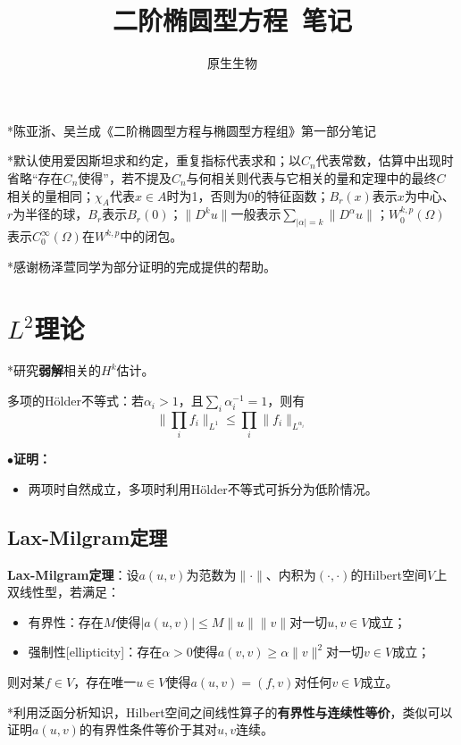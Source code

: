 \documentclass[a4paper,UTF8,fontset=windows,AutoFakeBold]{ctexart}
\title{\textbf{二阶椭圆型方程\ 笔记}}
\author{原生生物}
\date{}
\newcommand{\proo}[1]{{\kaishu $\bullet$\textbf{证明：}
\begin{itemize}
    \item[] #1
\end{itemize}
}}
\begin{document}
\maketitle

*陈亚浙、吴兰成《二阶椭圆型方程与椭圆型方程组》第一部分笔记

*默认使用爱因斯坦求和约定，重复指标代表求和；以$C_n$代表常数，估算中出现时省略``存在$C_n$使得''，若不提及$C_n$与何相关则代表与它相关的量和定理中的最终$C$相关的量相同；$\chi_A$代表$x\in A$时为1，否则为0的特征函数；$B_r(x)$表示$x$为中心、$r$为半径的球，$B_r$表示$B_r(0)$；$\|D^ku\|$一般表示$\sum_{|\alpha|=k}\|D^\alpha u\|$；$W_0^{k,p}(\Omega)$表示$C_0^\infty(\Omega)$在$W^{k,p}$中的闭包。

*感谢杨泽萱同学为部分证明的完成提供的帮助。

\tableofcontents

\newpage
\section{$L^2$理论}
*研究\textbf{弱解}相关的$H^k$估计。

多项的H\"older不等式：若$\alpha_i>1$，且$\sum_i\alpha_i^{-1}=1$，则有
$$\bigg\|\prod_if_i\bigg\|_{L^1}\le\prod_i\|f_i\|_{L^{\alpha_i}}$$
\proo{
    两项时自然成立，多项时利用H\"older不等式可拆分为低阶情况。
}

\subsection{Lax-Milgram定理}
\textbf{Lax-Milgram定理}：设$a(u,v)$为范数为$\|\cdot\|$、内积为$(\cdot,\cdot)$的Hilbert空间$V$上双线性型，若满足：
\begin{itemize}
    \item 有界性：存在$M$使得$|a(u,v)|\le M\|u\|\|v\|$对一切$u,v\in V$成立；
    \item 强制性[ellipticity]：存在$\alpha>0$使得$a(v,v)\ge\alpha\|v\|^2$对一切$v\in V$成立；
\end{itemize}
则对某$f\in V$，存在唯一$u\in V$使得$a(u,v)=(f,v)$对任何$v\in V$成立。

*利用泛函分析知识，Hilbert空间之间线性算子的\textbf{有界性与连续性等价}，类似可以证明$a(u,v)$的有界性条件等价于其对$u,v$连续。
\end{document}
